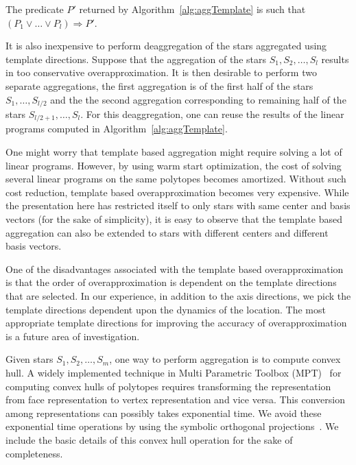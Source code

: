 \begin{lemma}
The predicate $P'$ returned by Algorithm~\ref{alg:aggTemplate} is such that $(P_1 \vee \ldots \vee P_l) \Rightarrow P'$.
\end{lemma}
\vspace{-0.1cm}

It is also inexpensive to perform deaggregation of the stars aggregated using template directions. 
%
Suppose that the aggregation of the stars $S_1, S_2, \ldots, S_l$ results in too conservative overapproximation. 
%
It is then desirable to perform two separate aggregations, the first aggregation is of the first half of the stars $S_1, \ldots, S_{l/2}$ and the the second aggregation corresponding to remaining half of the stars $S_{l/2+1}, \ldots, S_{l}$. 
%
For this deaggregation, one can reuse the results of the linear programs computed in Algorithm~\ref{alg:aggTemplate}.

One might worry that template based aggregation might require solving a lot of linear programs. 
%
However, by using warm start optimization, the cost of solving several linear programs on the same polytopes becomes amortized. 
%
Without such cost reduction, template based overapproximation becomes very expensive. 
%
While the presentation here has restricted itself to only stars with same center and basis vectors (for the sake of simplicity), it is easy to observe that the template based aggregation can also be extended to stars with different centers and different basis vectors.

One of the disadvantages associated with the template based overapproximation is that the order of overapproximation is dependent on the template directions that are selected. In our experience, in addition to the axis directions, we pick the template directions dependent upon the dynamics of the location. The most appropriate template directions for improving the accuracy of overapproximation is a future area of investigation.

Given stars $S_1, S_2, \ldots, S_m$, one way to perform aggregation is to compute convex hull. 
%
A widely implemented technique in Multi Parametric Toolbox (MPT)~\cite{kvasnica2004multi} for computing convex hulls of polytopes requires transforming the representation from face representation to vertex representation and vice versa. 
%
This conversion among representations can possibly takes exponential time. 
%
We avoid these exponential time operations by using the symbolic orthogonal projections~\cite{hagemann2014reachability}. 
%
We include the basic details of this convex hull operation for the sake of completeness.


